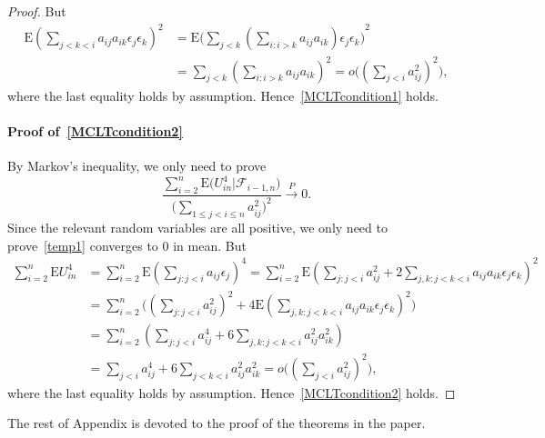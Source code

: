 \documentclass[review]{elsarticle}
\theoremstyle{plain}
\theoremstyle{definition}
\theoremstyle{remark}
\begin{document}
\begin{proof}
     But
     \begin{equation*}
         \begin{aligned}
         \mathrm{E}{(\sum_{j<k<i} a_{ij}a_{ik}\epsilon_j \epsilon_k)}^2
             &=
             \mathrm{E}{\big(\sum_{j<k} (\sum_{i:i>k}a_{ij}a_{ik})\epsilon_j \epsilon_k \big)}^2\\
             &=
             \sum_{j<k} (\sum_{i:i>k}a_{ij}a_{ik})^2
             =
             o\big({(\sum_{j<i} a_{ij}^2)}^2\big),
         \end{aligned}
     \end{equation*}
     where the last equality holds by assumption. Hence~\eqref{MCLTcondition1} holds.
     \paragraph{Proof of~\eqref{MCLTcondition2}}
     By Markov's inequality, we only need to prove
     \begin{equation}\label{temp1}
         \frac{\sum_{i=2}^n \mathrm{E}\big(U_{in}^4\big|\mathcal{F}_{i-1,n}\big)}{{\big(\sum_{1\leq j<i\leq n} a_{ij}^2\big)}^2}\xrightarrow{P} 0.
     \end{equation}
     Since the relevant random variables are all positive, we only need to prove~\eqref{temp1} converges to $0$ in mean. But
     \begin{equation*}
         \begin{aligned}
         \sum_{i=2}^n \mathrm{E} U_{in}^4
             &=
             \sum_{i=2}^n \mathrm{E} {(\sum_{j:j<i}a_{ij}\epsilon_j)}^4
             =
             \sum_{i=2}^n \mathrm{E} {(\sum_{j:j<i}a_{ij}^2+2\sum_{j,k:j<k<i}a_{ij}a_{ik}\epsilon_j \epsilon_k)}^2\\
             &=
             \sum_{i=2}^n  \big({(\sum_{j:j<i}a_{ij}^2)}^2+4\mathrm{E}{(\sum_{j,k:j<k<i}a_{ij}a_{ik}\epsilon_j \epsilon_k)}^2 \big)\\
             &=
             \sum_{i=2}^n  (\sum_{j:j<i}a_{ij}^4+6\sum_{j,k:j<k<i}a_{ij}^2 a_{ik}^2)\\
             &=
             \sum_{j<i}a_{ij}^4+6\sum_{j<k<i}a_{ij}^2 a_{ik}^2
             =
             o\big({(\sum_{j<i} a_{ij}^2)}^2\big),
         \end{aligned}
     \end{equation*}
     where the last equality holds by assumption. Hence~\eqref{MCLTcondition2} holds.
 \end{proof}

 The rest of Appendix is devoted to the proof of the theorems in the paper.
\end{document}
